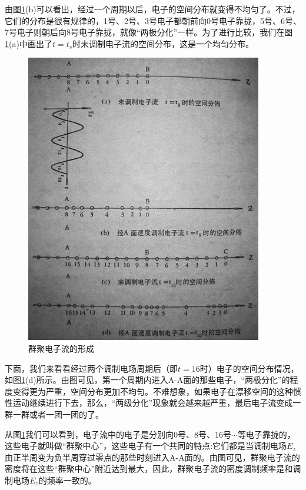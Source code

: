 由图\ref{ch2-3}(b)可以看出，经过一个周期以后，电子的空间分布就变得不均匀了。不过，它们的分布是很有规律的，1号、2号、3号电子都朝前向0号电子靠拢，5号、6号、7号电子则朝后向8号电子靠拢，就像“两极分化”一样。为了进行比较，我们在图\ref{ch2-3}(a)中画出了$ t=t_s $时未调制电子流的空间分布，这是一个均匀分布。
\begin{figure}[phtb]
	\centering
	\includegraphics[width=0.8\linewidth]{figure/ch2-3}
	\caption{群聚电子流的形成}
	\label{ch2-3}
\end{figure}

下面，我们来看看经过两个调制电场周期后（即$ t=16 $时）电子的空间分布情况，如图\ref{ch2-3}(d)所示。由图可见，第一个周期内进入A-A面的那些电子，“两极分化”的程度变得更为严重，空间分布更加不均匀。不难想象，如果电子在漂移空间的这种惯性运动继续进行下去，那么，“两级分化”现象就会越来越严重，最后电子流变成一群一群或者一团一团的了。

从图\ref{ch2-3}我们可以看到，电子流中的电子是分别向0号、8号、16号$ \cdots $等电子靠拢的，这些电子就叫做“群聚中心”，这些电子有一个共同的特点:它们都是当调制电场$ E_z $由正半周变为负半周穿过零点的那些时刻进入A-A面的。由图可见，群聚电子流的密度将在这些“群聚中心”附近达到最大，因此，群聚电子流的密度调制频率是和调制电场$ E_z $的频率一致的。

